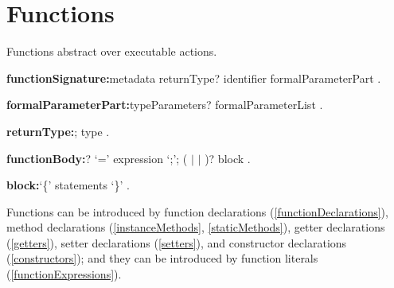 \documentclass{article}
\begin{document}
\section{Functions}

\LMHash{}
Functions abstract over executable actions.

\begin{grammar}
{\bf functionSignature:}metadata returnType? identifier formalParameterPart
  .

{\bf formalParameterPart:}typeParameters? formalParameterList
  .

{\bf returnType:}\VOID{};
  type
  .

{\bf functionBody:}\ASYNC{}? `={\escapegrammar \gt}' expression `{\escapegrammar ;}';
  (\ASYNC{} $|$ \ASYNC* $|$ \SYNC*)? block
  .

{\bf block:}`\{' statements `\}'
  .
\end{grammar}

\LMHash{}
Functions can be introduced by function declarations (\ref{functionDeclarations}),
method declarations (\ref{instanceMethods}, \ref{staticMethods}),
getter declarations (\ref{getters}),
setter declarations (\ref{setters}),
and constructor declarations (\ref{constructors});
and they can be introduced by function literals (\ref{functionExpressions}).
\end{document}
